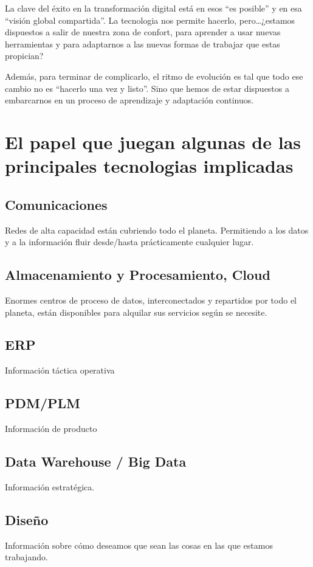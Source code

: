 \documentclass[spanish,12pt,a4paper,final,oneside]{book}
\begin{document}
La clave del éxito en la transformación digital está en esos ``es posible'' y en esa ``visión global compartida''. La tecnologia nos permite hacerlo, pero\ldots ¿estamos dispuestos a salir de nuestra zona de confort, para aprender a usar nuevas herramientas y para adaptarnos a las nuevas formas de trabajar que estas propician?

Además, para terminar de complicarlo, el ritmo de evolución es tal que todo ese cambio no es ``hacerlo una vez y listo''. Sino que hemos de estar dispuestos a embarcarnos en un proceso de aprendizaje y adaptación continuos.


\section*{El papel que juegan algunas de las principales tecnologias implicadas}

\subsection*{Comunicaciones}
Redes de alta capacidad están cubriendo todo el planeta. Permitiendo a los datos y a la información fluir desde/hasta prácticamente cualquier lugar.

\subsection*{Almacenamiento y Procesamiento, Cloud}
Enormes centros de proceso de datos, interconectados y repartidos por todo el planeta, están disponibles para alquilar sus servicios según se necesite.

\subsection*{ERP}
Información táctica operativa

\subsection*{PDM/PLM}
Información de producto

\subsection*{Data Warehouse / Big Data}
Información estratégica.

\subsection*{Diseño}
Información sobre cómo deseamos que sean las cosas en las que estamos trabajando.
\end{document}
